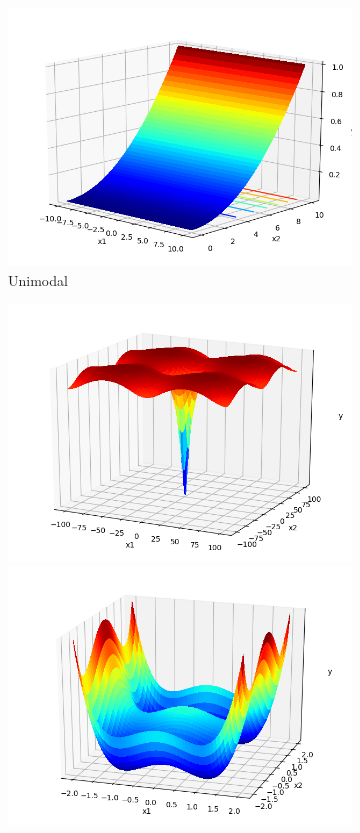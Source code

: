 \documentclass[a4paper,13pt,2p]{report}
\begin{document}
\begin{figure}[!ht]
\begin{subfigure}{0.24\textwidth}
  	 \includegraphics[width=1\linewidth]{png/functions/islo_uni_F8}
  	\caption{Unimodal}
  	\label{subfig:uni}
  	\end{subfigure}
    \begin{subfigure}{0.24\textwidth}
   	\includegraphics[width=1\linewidth]{png/functions/islo_multi_F9}
  	 \includegraphics[width=1\linewidth]{png/functions/islo_multi_F11}

\end{subfigure}
\end{figure}
\end{document}
